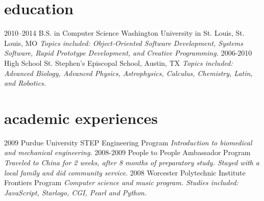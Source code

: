 \documentclass[]{cv}
\begin{document}
\section{education}

\begin{entrylist}
  \entry
    {2010–2014}
    {B.S. in Computer Science}
    {Washington University in St. Louis, St. Louis, MO}
    {\emph{Topics included: Object‐Oriented Software Development, Systems Software, Rapid Prototype Development, and Creative Programming.}}
  \entry
    {2006-2010}
    {High School}
    {St. Stephen’s Episcopal School, Austin, TX}
    {\emph{Topics included: Advanced Biology, Advanced Physics, Astrophysics, Calculus, Chemistry, Latin, and Robotics.}}
\end{entrylist}

\section{academic experiences}

\begin{entrylist}
  \entry
    {2009}
    {Purdue University STEP Engineering Program}{}
    {\emph{Introduction to biomedical and mechanical engineering.}}
  \entry
    {2008-2009}
    {People to People Ambassador Program}{}
    {\emph{Traveled to China for 2 weeks, after 8 months of preparatory study. Stayed with a local family and did community service.}}
  \entry
    {2008}
    {Worcester Polytechnic Institute Frontiers Program}{}
    {\emph{Computer science and music program. Studies included: JavaScript, Starlogo, CGI, Pearl and Python.}}
\end{entrylist}
\end{document}
